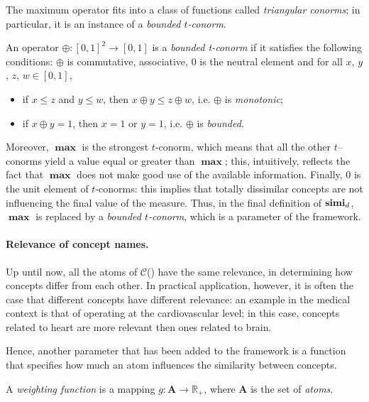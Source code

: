   The maximum operator fits into a class of functions called \emph{triangular conorms};
  in particular, it is an instance of a \emph{bounded \(t\)-conorm}.
  \begin{definition}%
    \label{dfn:conorm}
    An operator \(\oplus \colon {[0,1]}^2 \to [0,1]\) is a \emph{bounded t-conorm} if it satisfies the following conditions: \(\oplus\) is commutative, associative, \(0\) is the neutral element and for all \(x\), \(y\), \(z\), \(w \in [0,1]\),
    \begin{itemize}
      \item if \(x \le z\) and \(y \le w\), then \(x \oplus y \le z \oplus w\), i.e. \(\oplus{}\) is \emph{monotonic};
      \item if \(x \oplus y = 1\), then \(x = 1\) or \(y = 1\), i.e. \(\oplus{}\) is \emph{bounded}.
    \end{itemize}
  \end{definition}
  Moreover, \(\mathbf{\max}\) is the strongest \(t\)-conorm, which means that all the other \(t\)--conorms yield a value equal or greater than \(\mathbf{\max}\); this, intuitively, reflects the fact that \(\mathbf{\max}\) does not make good use of the available information.
  Finally, \(0\) is the unit element of \(t\)-conorms: this implies that totally dissimilar concepts are not influencing the final value of the measure.
  Thus, in the final definition of \(\mathbf{simi}_d\), \(\mathbf{\max}\) is replaced by a \emph{bounded \(t\)-conorm}, which is a parameter of the framework.

  \paragraph{Relevance of concept names.}
  Up until now, all the atoms of \(\mathcal{C}\)(\elh) have the same relevance, in determining how concepts differ from each other.
  In practical application, however, it is often the case that different concepts have different relevance: an example in the medical context is that of operating at the cardiovascular level; in this case, concepts related to heart are more relevant then ones related to brain.

  Hence, another parameter that has been added to the framework is a function that specifies how much an atom influences the similarity between concepts.
  \begin{definition}%
    A \emph{weighting function} is a mapping \(g \colon \mathbf{A} \to \mathbb{R}_+\), where \(\mathbf{A}\) is the set of \emph{atoms}.
  \end{definition}

